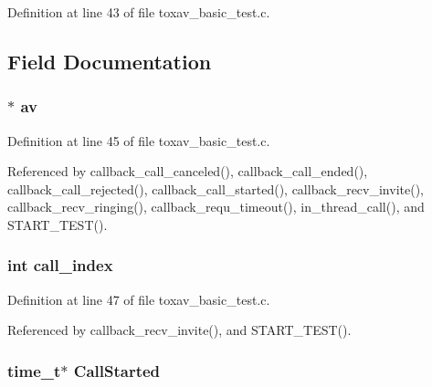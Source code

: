 Definition at line 43 of file toxav\+\_\+basic\+\_\+test.\+c.



\subsection{Field Documentation}
\hypertarget{struct___party_abcfe1d5431cfdb232964a0a3380f4e7e}{
\subsubsection[{av}]{ $\ast$ av}}\label{struct___party_abcfe1d5431cfdb232964a0a3380f4e7e}


Definition at line 45 of file toxav\+\_\+basic\+\_\+test.\+c.



Referenced by callback\+\_\+call\+\_\+canceled(), callback\+\_\+call\+\_\+ended(), callback\+\_\+call\+\_\+rejected(), callback\+\_\+call\+\_\+started(), callback\+\_\+recv\+\_\+invite(), callback\+\_\+recv\+\_\+ringing(), callback\+\_\+requ\+\_\+timeout(), in\+\_\+thread\+\_\+call(), and S\+T\+A\+R\+T\+\_\+\+T\+E\+S\+T().

\hypertarget{struct___party_a80d8424fa1a3824067bbf99be2b3b0c4}{
\subsubsection[{call\+\_\+index}]{\setlength{\rightskip}{0pt plus 5cm}int call\+\_\+index}}\label{struct___party_a80d8424fa1a3824067bbf99be2b3b0c4}


Definition at line 47 of file toxav\+\_\+basic\+\_\+test.\+c.



Referenced by callback\+\_\+recv\+\_\+invite(), and S\+T\+A\+R\+T\+\_\+\+T\+E\+S\+T().

\hypertarget{struct___party_a1695e5be04a1b45020f50e3a42d0e50c}{
\subsubsection[{Call\+Started}]{\setlength{\rightskip}{0pt plus 5cm}time\+\_\+t$\ast$ Call\+Started}}\label{struct___party_a1695e5be04a1b45020f50e3a42d0e50c}


